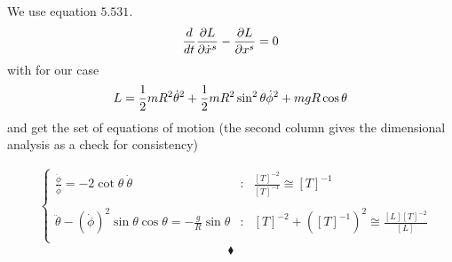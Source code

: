 We use equation $\mathbf{5.531.}$
\begin{align}
\dv{}{t}\frac{\partial L}{\partial \dot{x}^s} - \frac{\partial L}{\partial x^s} =0
\end{align}
with for our case
\begin{align}
L=  \frac{1}{2} m R^2\dot{\theta}^2 + \frac{1}{2} m R^2\sin^2\theta\dot{\phi}^2 +mgR \cos{\theta}
\end{align}
and get the set of equations of motion (the second column gives the dimensional analysis as a check for consistency)

\begin{align}
&\left\{\begin{array}{lll}
\frac{\ddot{\phi}}{\dot{\phi}}=  -2\cot\theta \  \dot{\theta}&:&\frac{[T]^{-2}}{[T]^{-1}}\cong [T]^{-1}\\\\
\ddot{\theta} - \left(\dot{\phi}\right)^2\sin\theta \cos\theta= -\frac{g}{R}\sin{\theta}&:&[T]^{-2}+\left([T]^{-1}\right)^2 \cong \frac{[L][T]^{-2}}{[L]^{}}\\\
\end{array}\right.
\end{align}
$$\blacklozenge$$
\newpage

